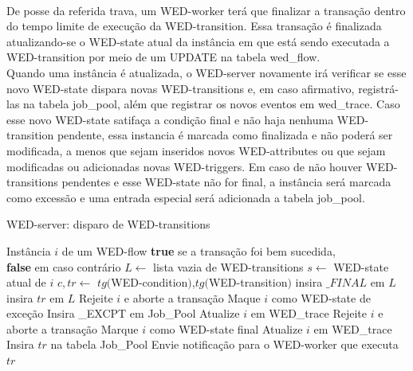 \documentclass[conference]{IEEEtran}
\begin{document}
\\
\indent De posse da referida trava, um WED-worker terá que finalizar a transação dentro do tempo limite de execução da WED-transition.
Essa transação é finalizada atualizando-se o WED-state atual da instância em que está sendo executada a WED-transition por meio
de um UPDATE na tabela wed\_flow.
\\
\indent Quando uma instância é atualizada, o WED-server novamente irá verificar se esse novo WED-state dispara novas WED-transitions
e, em caso afirmativo, registrá-las na tabela job\_pool, além que registrar os novos eventos em wed\_trace. Caso esse novo WED-state
satifaça a condição final e não haja nenhuma WED-transition pendente, essa instancia é marcada como finalizada e não poderá ser
modificada, a menos que sejam inseridos novos WED-attributes ou que sejam modificadas ou adicionadas novas WED-triggers. Em
caso de não houver WED-transitions pendentes e esse WED-state não for final, a instância será marcada como excessão e uma
entrada especial será adicionada a tabela job\_pool.
\begin{algorithm}
\caption{WED-server: disparo de WED-transitions}
\label{alg1}
\begin{algorithmic}[1]
\REQUIRE Instância $i$ de um WED-flow
\ENSURE \textbf{true} se a transação foi bem sucedida,\\
         \hspace{23pt}\textbf{false} em caso contrário
\STATE $L \leftarrow$ lista vazia de WED-transitions 
\STATE $s \leftarrow$ WED-state atual de $i$
\STATE $c,tr \leftarrow$ $tg($WED-condition$)$,$tg($WED-transition$)$
\STATE insira $\_FINAL$ em $L$
\ELSE
\STATE insira $tr$ em $L$
\ENDIF
\ENDIF
\ENDFOR
{}
\STATE Rejeite $i$ e aborte a transação
\RETURN \FALSE
{}
\STATE Maque $i$ como WED-state de exceção
\STATE Insira \_EXCPT em Job\_Pool
\ENDIF
\STATE Atualize $i$ em WED\_trace
\RETURN \TRUE
{}
\STATE Rejeite $i$ e aborte a transação
\RETURN \FALSE
\ELSE
\STATE Marque $i$ como WED-state final
\STATE Atualize $i$ em WED\_trace
\RETURN \TRUE
\ENDIF
\ELSE
{}
\STATE Insira $tr$ na tabela Job\_Pool
\STATE Envie notificação para o WED-worker que executa $tr$
\RETURN \TRUE
\ENDFOR
\ENDIF

\end{algorithmic}
\end{algorithm}
\end{document}
